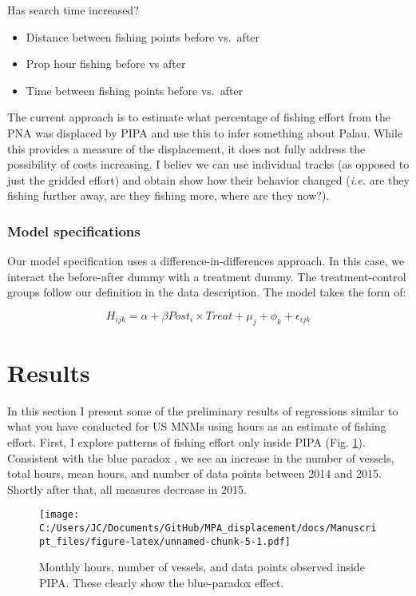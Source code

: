 \documentclass[]{article}
\providecommand{\tightlist}{%
  \setlength{\itemsep}{0pt}\setlength{\parskip}{0pt}}
\theoremstyle{definition}
\theoremstyle{definition}
\theoremstyle{definition}
\theoremstyle{remark}
\begin{document}
Has search time increased?

\begin{itemize}
\tightlist
\item
  Distance between fishing points before vs.~after
\item
  Prop hour fishing before vs after
\item
  Time between fishing points before vs.~after
\end{itemize}

The current approach is to estimate what percentage of fishing effort
from the PNA was displaced by PIPA and use this to infer something about
Palau. While this provides a measure of the displacement, it does not
fully address the possibility of costs increasing. I believ we can use
individual tracks (as opposed to just the gridded effort) and obtain
show how their behavior changed (\emph{i.e.} are they fishing further
away, are they fishing more, where are they now?).

\subsubsection{Model specifications}\label{model-specifications}

Our model specification uses a difference-in-differences approach. In
this case, we interact the before-after dummy with a treatment dummy.
The treatment-control groups follow our definition in the data
description. The model takes the form of:

\[
H_{ijk} = \alpha + \beta Post_i \times Treat + \mu_j + \phi_k + \epsilon_{ijk}
\]

\section{Results}\label{results}

In this section I present some of the preliminary results of regressions
similar to what you have conducted for US MNMs using hours as an
estimate of fishing effort. First, I explore patterns of fishing effort
only inside PIPA (Fig. \ref{fig:blue_para}). Consistent with the blue
paradox \citep{mcdermott_2018}, we see an increase in the number of
vessels, total hours, mean hours, and number of data points between 2014
and 2015. Shortly after that, all measures decrease in 2015.

\begin{figure}
\centering
\texttt{[image: C:/Users/JC/Documents/GitHub/MPA\_displacement/docs/Manuscript\_files/figure-latex/unnamed-chunk-5-1.pdf]}
\caption{\label{fig:unnamed-chunk-5}\label{fig:blue_para}Monthly hours,
number of vessels, and data points observed inside PIPA. These clearly
show the blue-paradox effect.}
\end{figure}
\end{document}
